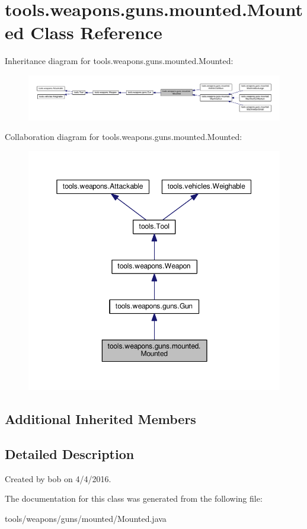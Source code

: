 \hypertarget{classtools_1_1weapons_1_1guns_1_1mounted_1_1_mounted}{}\section{tools.\+weapons.\+guns.\+mounted.\+Mounted Class Reference}
\label{classtools_1_1weapons_1_1guns_1_1mounted_1_1_mounted}


Inheritance diagram for tools.\+weapons.\+guns.\+mounted.\+Mounted\+:
\nopagebreak
\begin{figure}[H]
\begin{center}
\leavevmode
\includegraphics[width=350pt]{classtools_1_1weapons_1_1guns_1_1mounted_1_1_mounted__inherit__graph}
\end{center}
\end{figure}


Collaboration diagram for tools.\+weapons.\+guns.\+mounted.\+Mounted\+:
\nopagebreak
\begin{figure}[H]
\begin{center}
\leavevmode
\includegraphics[width=350pt]{classtools_1_1weapons_1_1guns_1_1mounted_1_1_mounted__coll__graph}
\end{center}
\end{figure}
\subsection*{Additional Inherited Members}


\subsection{Detailed Description}
Created by bob on 4/4/2016. 

The documentation for this class was generated from the following file\+:\begin{DoxyCompactItemize}
\item 
tools/weapons/guns/mounted/Mounted.\+java\end{DoxyCompactItemize}
